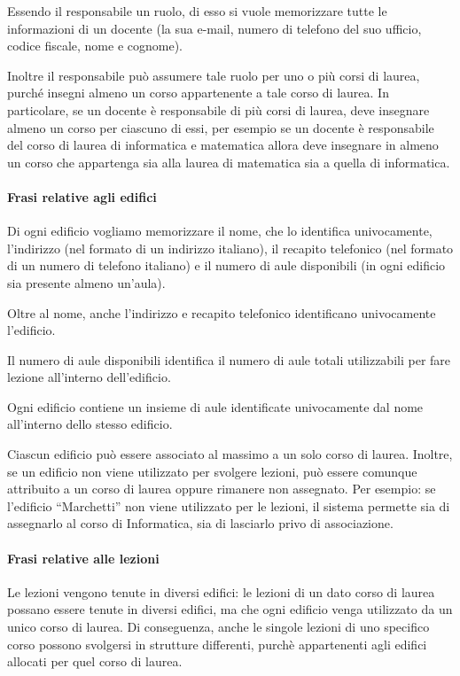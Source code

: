 \documentclass[a4paper,11pt]{article}
\begin{document}
Essendo il responsabile un ruolo, di esso si vuole memorizzare tutte le informazioni di un docente (la sua e-mail, numero di telefono del suo ufficio, codice fiscale, nome e cognome).

Inoltre il responsabile può assumere tale ruolo per uno o più corsi di laurea, purché insegni almeno un corso appartenente a tale corso di laurea. In particolare, se un docente è responsabile di più corsi di laurea, deve insegnare almeno un corso per ciascuno di essi, per esempio se un docente è responsabile del corso di laurea di informatica e matematica allora deve insegnare in almeno un corso che appartenga sia alla laurea di matematica sia a quella di informatica.


\paragraph{Frasi relative agli edifici}

Di ogni edificio vogliamo memorizzare il nome, che lo identifica univocamente, l'indirizzo (nel formato di un indirizzo italiano), il recapito telefonico (nel formato di un numero di telefono italiano) e il numero di aule disponibili (in ogni edificio sia presente almeno un'aula).

Oltre al nome, anche l'indirizzo e recapito telefonico identificano univocamente l'edificio.

Il numero di aule disponibili identifica il numero di aule totali utilizzabili per fare lezione all'interno dell'edificio.

Ogni edificio contiene un insieme di aule identificate univocamente dal nome all'interno dello stesso edificio.

Ciascun edificio può essere associato al massimo a un solo corso di laurea. Inoltre, se un edificio non viene utilizzato per svolgere lezioni, può essere comunque attribuito a un corso di laurea oppure rimanere non assegnato. Per esempio: se l'edificio ``Marchetti'' non viene utilizzato per le lezioni, il sistema permette sia di assegnarlo al corso di Informatica, sia di lasciarlo privo di associazione.



\paragraph{Frasi relative alle lezioni}

Le lezioni vengono tenute in diversi edifici: le lezioni di un dato corso di laurea possano essere tenute in diversi edifici, ma che ogni edificio venga utilizzato da un unico corso di laurea. Di conseguenza, anche le singole lezioni di uno specifico corso possono svolgersi in strutture differenti, purchè appartenenti agli edifici allocati per quel corso di laurea.
\end{document}
